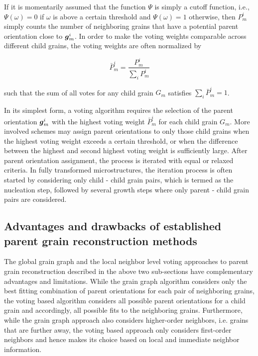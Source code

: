 \documentclass{elsarticle}
\renewcommand{\vec}[1]{\ensuremath \mathbf{\boldsymbol{#1}}}
\numberwithin{equation}{section}
\begin{document}
If it is momentarily assumed that the function $\Psi$ is simply a cutoff function, i.e., $\Psi(\omega)=0$ if $\omega$ is above a certain threshold and $\Psi(\omega)=1$ otherwise,  then $P_{m}^{i}$ simply counts the number of neighboring grains that have a potential parent orientation close to $\vec g_m^i$. In order to make the voting weights comparable across different child grains, the voting weights are often normalized by

\begin{equation*}
  \bar P_{m}^{i}
  = \frac{P_{m}^{i}}{\sum\limits_{i} P_{m}^{i}}
\end{equation*}

such that the sum of all votes for any child grain $G_m$ satisfies $\sum\limits_{i} \bar P_{m}^{i}=1$.

In its simplest form, a voting algorithm requires the selection of the parent orientation $\vec g_m^i$ with the highest voting weight $\bar P_{m}^{i}$ for each child grain $G_m$. More involved schemes may assign parent orientations to only those child grains when the highest voting weight exceeds a certain threshold, or when the difference between the highest and second highest voting weight is sufficiently large. After parent orientation assignment, the process is iterated with equal or relaxed criteria. In fully transformed microstructures, the iteration process is often started by considering only child - child grain pairs, which is termed as the nucleation step, followed by several growth steps where only parent - child grain pairs are considered.



\subsection{Advantages and drawbacks of established parent grain reconstruction methods}
\label{sec:drawb-reconstr-meth}
The global grain graph and the local neighbor level voting approaches to parent grain reconstruction described in the above two sub-sections have complementary advantages and limitations. While the grain graph algorithm considers only the best fitting combination of parent orientations for each pair of neighboring grains, the voting based algorithm considers all possible parent orientations for a child grain and accordingly, all possible fits to the neighboring grains. Furthermore, while the grain graph approach also considers higher-order neighbors, i.e. grains that are further away, the voting based approach only considers first-order neighbors and hence makes its choice based on local and immediate neighbor information. 
\end{document}
